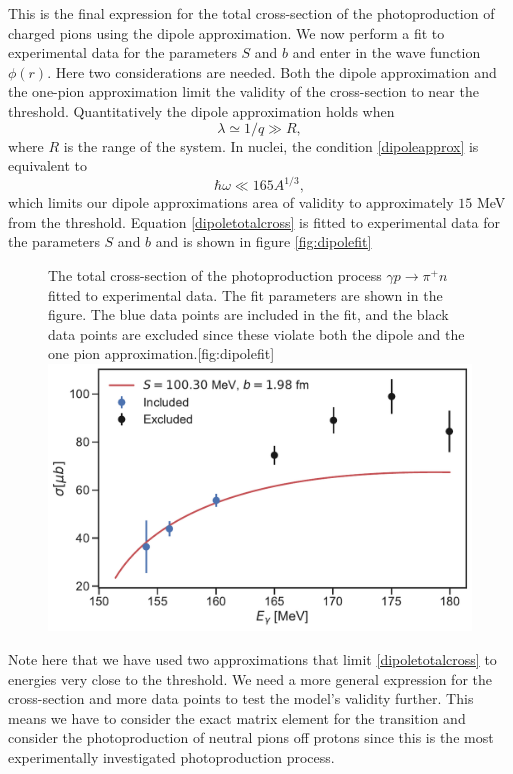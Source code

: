This is the final expression for the total cross-section of the photoproduction of charged pions using the dipole approximation. We now perform a fit to experimental data for the parameters $S$ and $b$ and enter in the wave function $\phi(r)$. Here two considerations are needed. Both the dipole approximation and the one-pion approximation limit the validity of the cross-section to near the threshold. Quantitatively the dipole approximation holds when 
\begin{equation}\label{dipoleapprox}
	\lambda \simeq 1/q \gg R,
\end{equation}
where $R$ is the range of the system. In nuclei, the condition \eqref{dipoleapprox} is equivalent to 
\begin{equation}\label{dipolenuc}
	\hbar \omega \ll 165 A^{1/3},
\end{equation}
which limits our dipole approximations area of validity to approximately $15$ MeV from the threshold. Equation \eqref{dipoletotalcross} is fitted to experimental data for the parameters $S$ and $b$ and is shown in figure \ref{fig:dipolefit}
\begin{figure}[H]
	\begin{sidecaption}{The total cross-section of the photoproduction process $\gamma p \rightarrow \pi^+ n$ fitted to experimental data. The fit parameters are shown in the figure. The blue data points are included in the fit, and the black data points are excluded since these violate both the dipole and the one pion approximation.}[fig:dipolefit]
		\includegraphics[width=\linewidth]{Figures/dipole_approximation.pdf}
	\end{sidecaption}
\end{figure}
Note here that we have used two approximations that limit \eqref{dipoletotalcross} to energies very close to the threshold. We need a more general expression for the cross-section and more data points to test the model's validity further. This means we have to consider the exact matrix element for the transition and consider the photoproduction of neutral pions off protons since this is the most experimentally investigated photoproduction process. 
